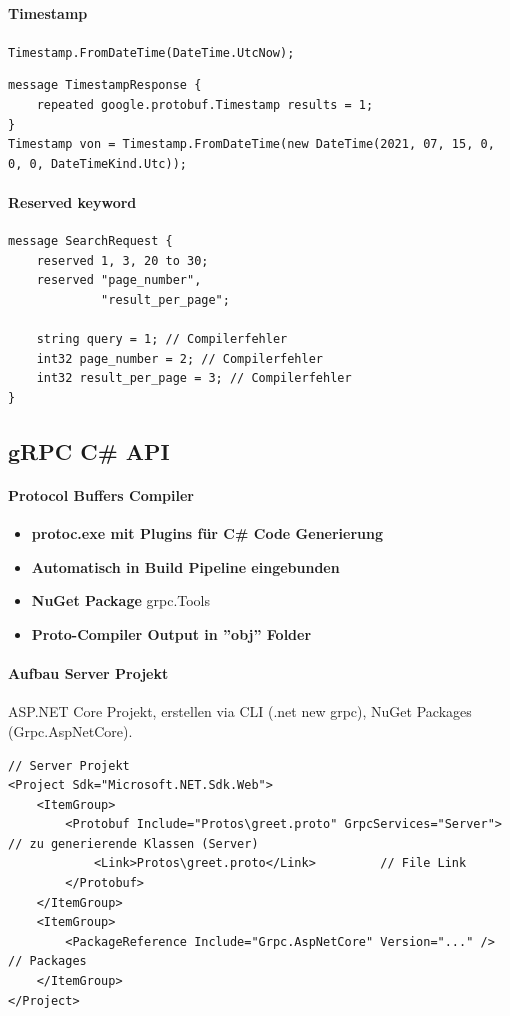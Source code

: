 \documentclass[
a4paper,
oneside,
10pt,
fleqn,
headsepline,
toc=listofnumbered, 
bibliography=totocnumbered]{scrartcl}
\begin{document}
\paragraph{Timestamp} \lstinline{Timestamp.FromDateTime(DateTime.UtcNow);}
\begin{lstlisting}
message TimestampResponse {
    repeated google.protobuf.Timestamp results = 1;
}
Timestamp von = Timestamp.FromDateTime(new DateTime(2021, 07, 15, 0, 0, 0, DateTimeKind.Utc));
\end{lstlisting}



\paragraph{Reserved keyword}
\begin{lstlisting}
message SearchRequest {
    reserved 1, 3, 20 to 30;
    reserved "page_number",
             "result_per_page";
             
    string query = 1; // Compilerfehler
    int32 page_number = 2; // Compilerfehler
    int32 result_per_page = 3; // Compilerfehler
}
\end{lstlisting}
\subsection{gRPC C\# API}
\paragraph{Protocol Buffers Compiler}
\begin{itemize}
	\item \textbf{protoc.exe mit Plugins für C\# Code Generierung}
	\item \textbf{Automatisch in Build Pipeline eingebunden}
	\item \textbf{NuGet Package} grpc.Tools
	\item \textbf{Proto-Compiler Output in ''obj'' Folder}
\end{itemize}

\paragraph{Aufbau Server Projekt} ASP.NET Core Projekt, erstellen via CLI (.net new grpc), NuGet Packages (Grpc.AspNetCore).
\begin{lstlisting}
// Server Projekt
<Project Sdk="Microsoft.NET.Sdk.Web">
    <ItemGroup>
        <Protobuf Include="Protos\greet.proto" GrpcServices="Server"> // zu generierende Klassen (Server)
            <Link>Protos\greet.proto</Link>         // File Link
        </Protobuf>
    </ItemGroup>
    <ItemGroup>
        <PackageReference Include="Grpc.AspNetCore" Version="..." />  // Packages
    </ItemGroup>
</Project>
\end{lstlisting}
\end{document}
